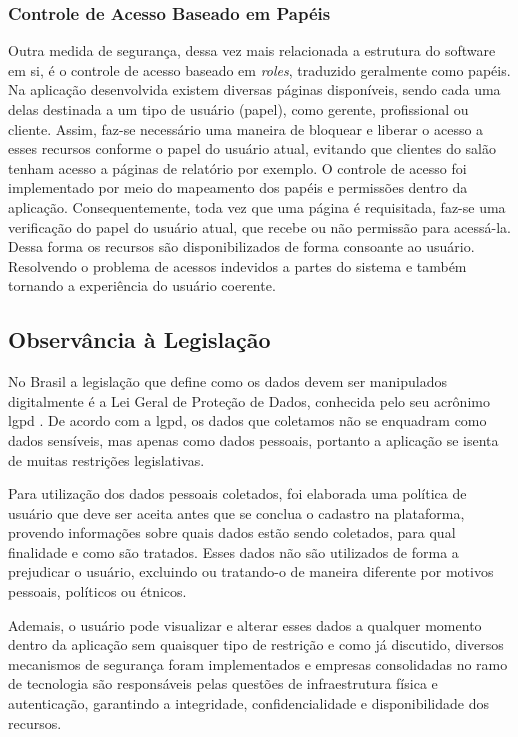 \subsubsection{Controle de Acesso Baseado em Papéis}
Outra medida de segurança, dessa vez mais relacionada a estrutura do software em si, é o controle de acesso baseado em \textit{roles}, traduzido geralmente como papéis.
Na aplicação desenvolvida existem diversas páginas disponíveis, sendo cada uma delas destinada a um tipo de usuário (papel), como gerente, profissional ou cliente. Assim, faz-se necessário uma maneira de bloquear e liberar o acesso a esses recursos conforme o papel do usuário atual, evitando que clientes do salão tenham acesso a páginas de relatório por exemplo.
O controle de acesso foi implementado por meio do mapeamento dos papéis e permissões dentro da aplicação. Consequentemente, toda vez que uma página é requisitada, faz-se uma verificação do papel do usuário atual, que recebe ou não permissão para acessá-la.
Dessa forma os recursos são disponibilizados de forma consoante ao usuário. Resolvendo o problema de acessos indevidos a partes do sistema e também tornando a experiência do usuário coerente.

\subsection{Observância à Legislação}
No Brasil a legislação que define como os dados devem ser manipulados digitalmente é a Lei Geral de Proteção de Dados, conhecida pelo seu acrônimo \gls{lgpd} \cite{lgpd}. De acordo com a \gls{lgpd}, os dados que coletamos não se enquadram como dados sensíveis, mas apenas como dados pessoais, portanto a aplicação se isenta de muitas restrições legislativas.

Para utilização dos dados pessoais coletados, foi elaborada uma política de usuário que deve ser aceita antes que se conclua o cadastro na plataforma, provendo informações sobre quais dados estão sendo coletados, para qual finalidade e como são tratados.  Esses dados não são utilizados de forma a prejudicar o usuário, excluindo ou tratando-o de maneira diferente por motivos pessoais, políticos ou étnicos. 

Ademais, o usuário pode visualizar e alterar esses dados a qualquer momento dentro da aplicação sem quaisquer tipo de restrição e como já discutido, diversos mecanismos de segurança foram implementados e empresas consolidadas no ramo de tecnologia são responsáveis pelas questões de infraestrutura física e autenticação, garantindo a integridade, confidencialidade e disponibilidade dos recursos.